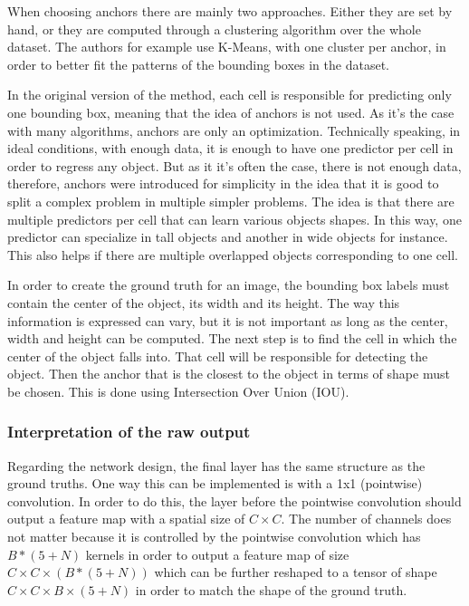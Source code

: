 When choosing anchors there are mainly two approaches. Either they are set by hand, or they are computed through a clustering algorithm over the whole dataset. The authors for example use K-Means, with one cluster per anchor, in order to better fit the patterns of the bounding boxes in the dataset. 

In the original version of the method, each cell is responsible for predicting only one bounding box, meaning that the idea of anchors is not used. As it's the case with many algorithms, anchors are only an optimization. Technically speaking, in ideal conditions, with enough data, it is enough to have one predictor per cell in order to regress any object. But as it it's often the case, there is not enough data, therefore, anchors were introduced for simplicity in the idea that it is good to split a complex problem in multiple simpler problems. The idea is that there are multiple predictors per cell that can learn various objects shapes. In this way, one predictor can specialize in tall objects and another in wide objects for instance. This also helps if there are multiple overlapped objects corresponding to one cell. 

In order to create the ground truth for an image, the bounding box labels must contain the center of the object, its width and its height. The way this information is expressed can vary, but it is not important as long as the center, width and height can be computed. The next step is to find the cell in which the center of the object falls into. That cell will be responsible for detecting the object. Then the anchor that is the closest to the object in terms of shape must be chosen. This is done using Intersection Over Union (IOU). 

\subsubsection{Interpretation of the raw output}

Regarding the network design, the final layer has the same structure as the ground truths. One way this can be implemented is with a 1x1 (pointwise) convolution. In order to do this, the layer before the pointwise convolution should output a feature map with a spatial size of $C \times C$. The number of channels does not matter because it is controlled by the pointwise convolution which has $B * (5 + N)$ kernels in order to output a feature map of size $C \times C \times (B * (5+N))$ which can be further reshaped to a tensor of shape $C \times C \times B \times (5+N)$ in order to match the shape of the ground truth.

